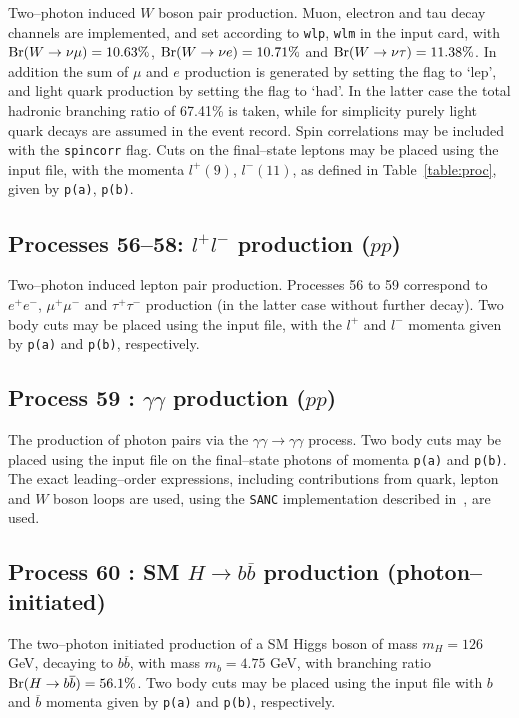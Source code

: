 \documentclass[12pt]{article}
\begin{document}
Two--photon induced $W$ boson pair production. Muon, electron and tau decay channels are implemented, and set according to \texttt{wlp}, 
\texttt{wlm} in the input card, with ${\rm Br}(W\to \nu \mu)=10.63\%$, ${\rm Br}(W\to \nu e)=10.71\%$ and ${\rm Br}(W\to \nu \tau)=11.38\%$. In addition the sum of $\mu$ and $e$ production is generated by setting the flag to `lep', and light quark production by setting the flag to `had'. In the latter case the total hadronic branching ratio of 67.41\% is taken, while for simplicity purely light quark decays are assumed in the event record. Spin correlations may be  included with 
the \texttt{spincorr} flag. Cuts on the final--state leptons may be placed using the input file, with the momenta $l^+(9)$, $l^-(11)$, as 
defined in Table~\ref{table:proc}, given by \texttt{p(a)}, \texttt{p(b)}.

\subsection{Processes 56--58: $l^+l^-$ production ($pp$)}

Two--photon induced lepton pair production. Processes 56 to 59 correspond to $e^+e^-$, $\mu^+\mu^-$ and $\tau^+\tau^-$ production (in the latter 
case without further decay).  Two body cuts may be placed using the input file, with the $l^+$ and $l^-$ momenta given by \texttt{p(a)} and 
\texttt{p(b)}, respectively.


\subsection{Process 59 : $\gamma\gamma$ production ($pp$)}

The production of photon pairs via the $\gamma \gamma \to\gamma\gamma$ process. Two body cuts may be placed using the input file on the 
final--state photons of momenta  \texttt{p(a)} and \texttt{p(b)}.  
The exact leading--order expressions, including contributions from quark, lepton and $W$ boson loops are used, using the \texttt{SANC} implementation
 described in~\cite{Bardin:2009gq}, are used.

\subsection{Process 60 : SM $H\to b\overline{b}$ production (photon--initiated)}

The two--photon initiated production of a SM Higgs boson of mass $m_H=126$ GeV, decaying to $b\overline{b}$, with mass $m_b=4.75$ GeV, with 
branching ratio ${\rm Br}(H\to b\overline{b})=56.1\%$. Two body cuts may be placed using the input file with $b$ and $\overline{b}$ momenta 
given by \texttt{p(a)} and \texttt{p(b)}, respectively.
\end{document}
